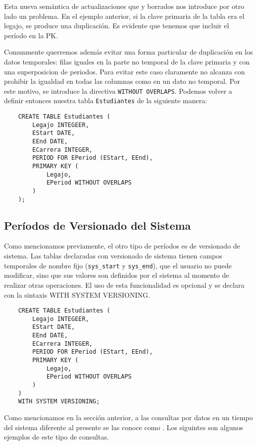 Esta nueva semántica de actualizaciones que y borrados nos introduce por otro lado un problema.
En el ejemplo anterior, si la clave primaria de la tabla era el legajo, se produce una duplicación.
Es evidente que tenemos que incluir el período en la PK.

Comunmente querremos además evitar una forma particular de duplicación en los datos temporales:
filas iguales en la parte no temporal de la clave primaria y con una superposicion de periodos.
Para evitar este caso claramente no alcanza con prohibir la igualdad en todas las columnas como en un dato no temporal.
Por este motivo, se introduce la directiva \texttt{WITHOUT OVERLAPS}.
Podemos volver a definir entonces nuestra tabla \texttt{Estudiantes} de la siguiente manera:

\begin{verbatim}
    CREATE TABLE Estudiantes (
        Legajo INTEGEER,
        EStart DATE,
        EEnd DATE,
        ECarrera INTEGER,
        PERIOD FOR EPeriod (EStart, EEnd),
        PRIMARY KEY (
            Legajo,
            EPeriod WITHOUT OVERLAPS
        )
    );
\end{verbatim}



\subsection{Períodos de Versionado del Sistema} \label{subsec:pvs}

Como mencionamos previamente, el otro tipo de períodos es de versionado de sistema.
Las tablas declaradas con versionado de sistema tienen campos temporales de nombre fijo (\texttt{sys\_start} y \texttt{sys\_end}),
que el usuario no puede modificar, sino que sus valores son definidos por el sistema al momento de realizar otras operaciones.
El uso de esta funcionalidad es opcional y se declara con la sintaxis WITH SYSTEM VERSIONING.

\begin{verbatim}
    CREATE TABLE Estudiantes (
        Legajo INTEGEER,
        EStart DATE,
        EEnd DATE,
        ECarrera INTEGER,
        PERIOD FOR EPeriod (EStart, EEnd),
        PRIMARY KEY (
            Legajo,
            EPeriod WITHOUT OVERLAPS
        )
    )
    WITH SYSTEM VERSIONING;
\end{verbatim}

Como mencionamos en la sección anterior,
a las consultas por datos en un tiempo del sistema diferente al presente se las conoce como .
Los siguintes son algunos ejemplos de este tipo de consultas.


